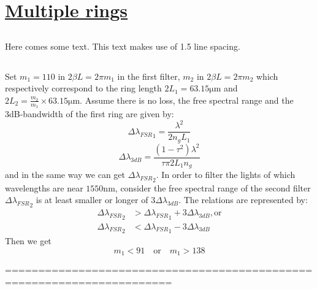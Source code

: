 \documentclass[fontsize=11pt]{scrartcl}
\begin{document}
\section{\uline{Multiple rings}}
\subsection{}
Here comes some text. This text makes use of 1.5 line spacing. 
\subsection{}
Set $m_1=110$ in $2\beta L = 2\pi m_1$ in the first filter, 
$m_2$ in $2\beta L = 2\pi m_2$
which respectively correspond to the ring length $2L_1 = 63.15\mathrm{\mu m}$
and $2L_2 = \frac{m_2}{m_1}\times 63.15\mathrm{\mu m}$. 
Assume there is no loss, the free spectral range and the 3dB-bandwidth
of the first ring
are given by:
\begin{equation}
    {\Delta \lambda_{F S R}}_1=\frac{\lambda^{2}}{2 n_{g} L_1}
\end{equation}
\begin{equation}
    \Delta \lambda_{3 d B}=\frac{\left(1-\tau^{2}\right) \lambda^{2}}{\tau  \pi 2 L_1 n_{g}}
\end{equation}
and in the same way we can get ${\Delta \lambda_{F S R}}_2$.
In order to filter the lights of which wavelengths are near $1550 \mathrm{nm}$,
consider the free spectral range of the second filter 
${\Delta \lambda_{F S R}}_2$ is 
at least smaller or longer of $3\Delta \lambda_{3 d B}$.
The relations are represented by:
\begin{equation}
    \begin{aligned}
    {\Delta \lambda_{F S R}}_2&>{\Delta \lambda_{F S R}}_1 + 3\Delta \lambda_{3 d B}, \mathrm{or}\\
    {\Delta \lambda_{F S R}}_2&<{\Delta \lambda_{F S R}}_1 - 3\Delta \lambda_{3 d B}
    \end{aligned}
\end{equation}
Then we get
\begin{equation}
    m_1 < 91 \quad \mathrm{or} \quad m_1 > 138
\end{equation}

\pagebreak
=======================================================================
\end{document}
